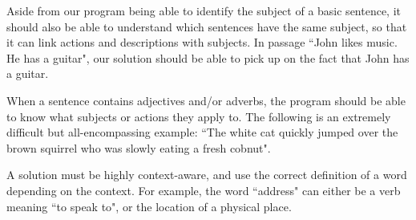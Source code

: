 \begin{challenge}
Aside from our program being able to identify the subject of a basic sentence, it should also be able to understand which sentences have the same subject, so that it can link actions and descriptions with subjects. In passage ``John likes music. He has a guitar", our solution should be able to pick up on the fact that John has a guitar.
\end{challenge}

\begin{challenge}
When a sentence contains adjectives and/or adverbs, the program should be able to know what subjects or actions they apply to. The following is an extremely difficult but all-encompassing example: ``The white cat quickly jumped over the brown squirrel who was slowly eating a fresh cobnut".
\end{challenge}

\begin{challenge}[Context]
A solution must be highly context-aware, and use the correct definition of a word depending on the context. For example, the word ``address" can either be a verb meaning ``to speak to", or the location of a physical place.
\end{challenge}